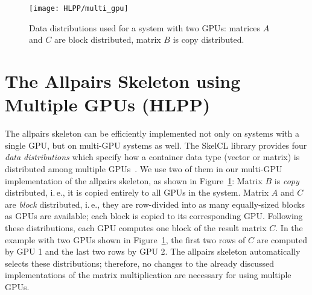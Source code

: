 \begin{figure}[b]
  \centering
  \texttt{[image: HLPP/multi\_gpu]}
  \caption{Data distributions used for a system with two GPUs: matrices $A$ and $C$ are block distributed, matrix $B$ is copy distributed.}
  \label{fig:multi_gpu}
\end{figure}

\section{The Allpairs Skeleton using Multiple GPUs (HLPP)}
\label{sec:multi_gpu}
The allpairs skeleton can be efficiently implemented not only on systems with a single GPU, but on multi-GPU systems as well.
The SkelCL library provides four \emph{data distributions} which specify how a container data type (vector or matrix) is distributed among multiple GPUs~\cite{StKG-12}.
We use two of them in our multi-GPU implementation of the allpairs skeleton, as shown in Figure~\ref{fig:multi_gpu}:
Matrix $B$ is \emph{copy} distributed, i.\,e., it is copied entirely to all GPUs in the system.
Matrix $A$ and $C$ are \emph{block} distributed, i.\,e., they are row-divided into as many equally-sized blocks as GPUs are available;
each block is copied to its corresponding GPU.
Following these distributions, each GPU computes one block of the result matrix $C$.
In the example with two GPUs shown in Figure~\ref{fig:multi_gpu}, the first two rows of $C$ are computed by GPU 1 and the last two rows by GPU 2.
The allpairs skeleton automatically selects these distributions; therefore, no changes to the already discussed implementations of the matrix multiplication are necessary for using multiple GPUs.





